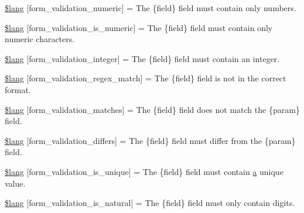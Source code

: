 \begin{DoxyCompactItemize}
\hyperlink{_admin_2system_2language_2english_2form__validation__lang_8php_abfd87d5b6c986ce3d4c0498ade54b380}{\$lang} \mbox{[}\textquotesingle{}form\+\_\+validation\+\_\+numeric\textquotesingle{}\mbox{]} = \textquotesingle{}The \{field\} field must contain only numbers.\textquotesingle{}
\item 
\hyperlink{_admin_2system_2language_2english_2form__validation__lang_8php_a520425fb2cba1854c9df71d98f5645c3}{\$lang} \mbox{[}\textquotesingle{}form\+\_\+validation\+\_\+is\+\_\+numeric\textquotesingle{}\mbox{]} = \textquotesingle{}The \{field\} field must contain only numeric characters.\textquotesingle{}
\item 
\hyperlink{_admin_2system_2language_2english_2form__validation__lang_8php_a4253ed0257e1c783da5b45a932b473ba}{\$lang} \mbox{[}\textquotesingle{}form\+\_\+validation\+\_\+integer\textquotesingle{}\mbox{]} = \textquotesingle{}The \{field\} field must contain an integer.\textquotesingle{}
\item 
\hyperlink{_admin_2system_2language_2english_2form__validation__lang_8php_a3642194a4f8f60f9588a66d6b2096755}{\$lang} \mbox{[}\textquotesingle{}form\+\_\+validation\+\_\+regex\+\_\+match\textquotesingle{}\mbox{]} = \textquotesingle{}The \{field\} field is not in the correct format.\textquotesingle{}
\item 
\hyperlink{_admin_2system_2language_2english_2form__validation__lang_8php_acdae85274ab41f354dc69117ff100389}{\$lang} \mbox{[}\textquotesingle{}form\+\_\+validation\+\_\+matches\textquotesingle{}\mbox{]} = \textquotesingle{}The \{field\} field does not match the \{param\} field.\textquotesingle{}
\item 
\hyperlink{_admin_2system_2language_2english_2form__validation__lang_8php_a2df815034671ae2aae09c5d8697d8ebf}{\$lang} \mbox{[}\textquotesingle{}form\+\_\+validation\+\_\+differs\textquotesingle{}\mbox{]} = \textquotesingle{}The \{field\} field must differ from the \{param\} field.\textquotesingle{}
\item 
\hyperlink{_admin_2system_2language_2english_2form__validation__lang_8php_ae450f8ce514e6c43b78599c8535c1647}{\$lang} \mbox{[}\textquotesingle{}form\+\_\+validation\+\_\+is\+\_\+unique\textquotesingle{}\mbox{]} = \textquotesingle{}The \{field\} field must contain \hyperlink{_admin_2assets_2js_2bootstrap_8min_8js_a1f5870dcf487187f13d5fd328ed9e6e7}{a} unique value.\textquotesingle{}
\item 
\hyperlink{_admin_2system_2language_2english_2form__validation__lang_8php_a10a669b7755f5eb6c4c0b5d8ad7af449}{\$lang} \mbox{[}\textquotesingle{}form\+\_\+validation\+\_\+is\+\_\+natural\textquotesingle{}\mbox{]} = \textquotesingle{}The \{field\} field must only contain digits.\textquotesingle{}

\end{DoxyCompactItemize}

